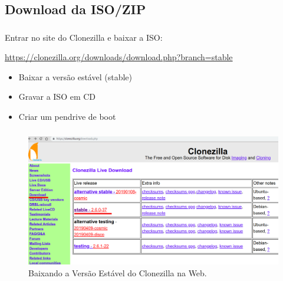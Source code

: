 \documentclass{beamer}
\begin{document}
\subsection{Download da ISO/ZIP}
\begin{frame}
    \frametitle{\insertsection}
    \framesubtitle{\insertsubsection}
    \justifying Entrar no site do Clonezilla  e baixar a ISO:
    
    \href{https://clonezilla.org/downloads/download.php?branch=stable}{https://clonezilla.org/downloads/download.php?branch=stable}
    
    \begin{itemize}[<+-| alert@+>]
        \item Baixar a versão estável (stable)
        \item Gravar a ISO em CD
        \item Criar um pendrive de boot
    \end{itemize}
\end{frame}
\begin{frame}
    \frametitle{\insertsection}
    \framesubtitle{\insertsubsection}
    
    \begin{figure}
        \centering
        \includegraphics[scale=0.22]{images/baixando_clonezilla.png}
        \caption{Baixando a Versão Estável do Clonezilla na Web.}
    \end{figure}
\end{frame}
\end{document}
